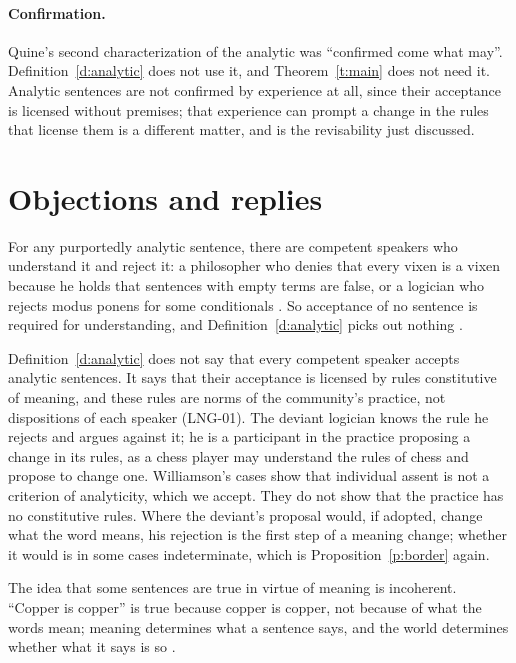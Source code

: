 \documentclass{situationist-preprint}
\begin{document}
\paragraph{Confirmation.} Quine's second characterization of the analytic was \enquote{confirmed come what may}. Definition~\ref{d:analytic} does not use it, and Theorem~\ref{t:main} does not need it. Analytic sentences are not confirmed by experience at all, since their acceptance is licensed without premises; that experience can prompt a change in the rules that license them is a different matter, and is the revisability just discussed.

\section{Objections and replies}

\begin{objection}
For any purportedly analytic sentence, there are competent speakers who understand it and reject it: a philosopher who denies that every vixen is a vixen because he holds that sentences with empty terms are false, or a logician who rejects modus ponens for some conditionals \citep{McGee1985}. So acceptance of no sentence is required for understanding, and Definition~\ref{d:analytic} picks out nothing \citep{Williamson2007}.
\end{objection}

\begin{reply}
Definition~\ref{d:analytic} does not say that every competent speaker accepts analytic sentences. It says that their acceptance is licensed by rules constitutive of meaning, and these rules are norms of the community's practice, not dispositions of each speaker (LNG-01). The deviant logician knows the rule he rejects and argues against it; he is a participant in the practice proposing a change in its rules, as a chess player may understand the rules of chess and propose to change one. Williamson's cases show that individual assent is not a criterion of analyticity, which we accept. They do not show that the practice has no constitutive rules. Where the deviant's proposal would, if adopted, change what the word means, his rejection is the first step of a meaning change; whether it would is in some cases indeterminate, which is Proposition~\ref{p:border} again.
\end{reply}

\begin{objection}
The idea that some sentences are true in virtue of meaning is incoherent. \enquote{Copper is copper} is true because copper is copper, not because of what the words mean; meaning determines what a sentence says, and the world determines whether what it says is so \citep{Boghossian1996}.
\end{objection}
\end{document}
